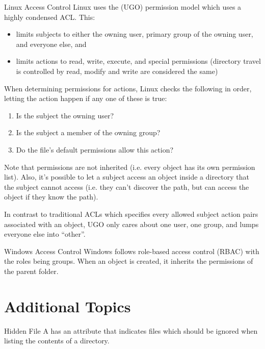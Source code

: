 \documentclass[12pt]{report}
\begin{document}
\begin{exbox}{Linux Access Control}{}
    Linux uses the  (UGO) permission model which uses a highly condensed ACL. This:
    \begin{itemize}[noitemsep]
        \item limits subjects to either the owning user, primary group of the owning user, and everyone else, and
        \item limits actions to read, write, execute, and special permissions (directory travel is controlled by read, modify and write are considered the same)
    \end{itemize}
    When determining permissions for actions, Linux checks the following in order, letting the action happen if any one of these is true:
    \begin{enumerate}[noitemsep]
        \item Is the subject the owning user?
        \item Is the subject a member of the owning group?
        \item Do the file's default permissions allow this action?
    \end{enumerate}
    Note that permissions are not inherited (i.e. every object has its own permission list). Also, it's possible to let a subject access an object inside a directory that the subject cannot access (i.e. they can't discover the path, but can access the object if they know the path).

    In contrast to traditional ACLs which specifies every allowed subject action pairs associated with an object, UGO only cares about one user, one group, and lumps everyone else into ``other''.
\end{exbox}

\begin{exbox}{Windows Access Control}{}
    Windows follows role-based access control (RBAC) with the roles being groups. When an object is created, it inherits the permissions of the parent folder.
\end{exbox}

\section{Additional Topics}

\begin{dfnbox}{Hidden File}{}
    A  has an attribute that indicates files which should be ignored when listing the contents of a directory.
\end{dfnbox}
\end{document}
